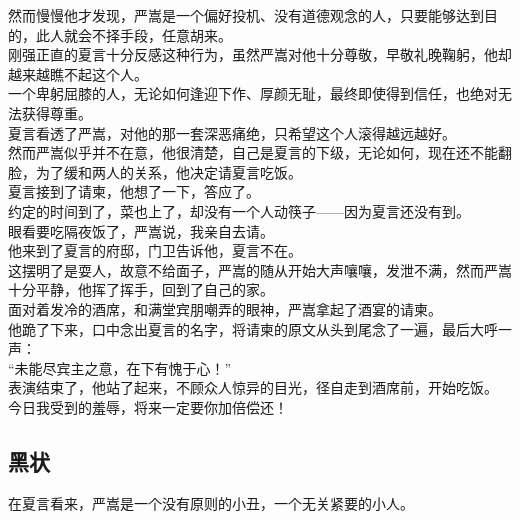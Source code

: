 \begin{multicols}{\theparacolNo}
然而慢慢他才发现，严嵩是一个偏好投机、没有道德观念的人，只要能够达到目的，此人就会不择手段，任意胡来。\\

刚强正直的夏言十分反感这种行为，虽然严嵩对他十分尊敬，早敬礼晚鞠躬，他却越来越瞧不起这个人。\\

一个卑躬屈膝的人，无论如何逢迎下作、厚颜无耻，最终即使得到信任，也绝对无法获得尊重。\\

夏言看透了严嵩，对他的那一套深恶痛绝，只希望这个人滚得越远越好。\\

然而严嵩似乎并不在意，他很清楚，自己是夏言的下级，无论如何，现在还不能翻脸，为了缓和两人的关系，他决定请夏言吃饭。\\

夏言接到了请柬，他想了一下，答应了。\\

约定的时间到了，菜也上了，却没有一个人动筷子——因为夏言还没有到。\\

眼看要吃隔夜饭了，严嵩说，我亲自去请。\\

他来到了夏言的府邸，门卫告诉他，夏言不在。\\

这摆明了是耍人，故意不给面子，严嵩的随从开始大声嚷嚷，发泄不满，然而严嵩十分平静，他挥了挥手，回到了自己的家。\\

面对着发冷的酒席，和满堂宾朋嘲弄的眼神，严嵩拿起了酒宴的请柬。\\

他跪了下来，口中念出夏言的名字，将请柬的原文从头到尾念了一遍，最后大呼一声：\\

“未能尽宾主之意，在下有愧于心！”\\

表演结束了，他站了起来，不顾众人惊异的目光，径自走到酒席前，开始吃饭。\\

今日我受到的羞辱，将来一定要你加倍偿还！\\

\subsection{黑状}
在夏言看来，严嵩是一个没有原则的小丑，一个无关紧要的小人。\\


\end{multicols}
